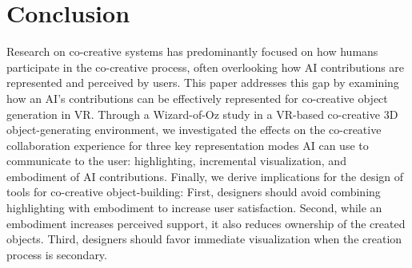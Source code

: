 \section{Conclusion}
Research on co-creative systems has predominantly focused on how humans participate in the co-creative process, often overlooking how AI contributions are represented and perceived by users. 
This paper addresses this gap by examining how an AI's contributions can be effectively represented for co-creative object generation in VR.
Through a Wizard-of-Oz study in a VR-based co-creative 3D object-generating environment, we investigated the effects on the co-creative collaboration experience for three key representation modes AI can use to communicate to the user: highlighting, incremental visualization, and embodiment of AI contributions.
Finally, we derive implications for the design of tools for co-creative object-building: First, designers should avoid combining highlighting with embodiment to increase user satisfaction. Second, while an embodiment increases perceived support, it also reduces ownership of the created objects. Third, designers should favor immediate visualization when the creation process is secondary.